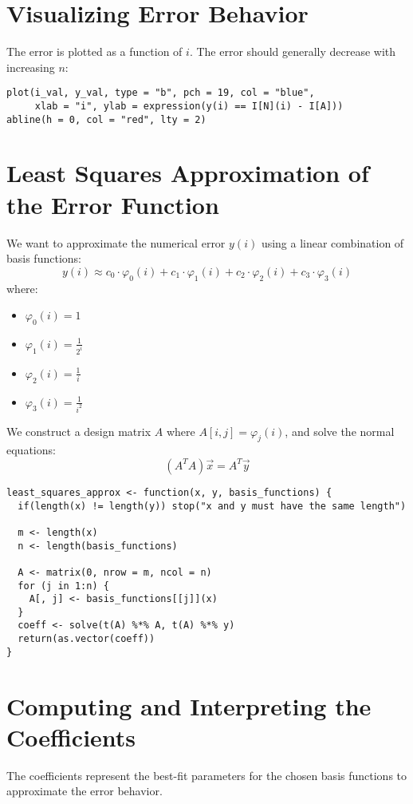 \documentclass[a4paper,12pt]{article}
\begin{document}
\section{Visualizing Error Behavior}
The error is plotted as a function of $i$. The error should generally decrease with increasing $n$:

\begin{lstlisting}[caption=Plot the numerical error]
plot(i_val, y_val, type = "b", pch = 19, col = "blue",
     xlab = "i", ylab = expression(y(i) == I[N](i) - I[A]))
abline(h = 0, col = "red", lty = 2)
\end{lstlisting}
\newpage
\section{Least Squares Approximation of the Error Function}
We want to approximate the numerical error $y(i)$ using a linear combination of basis functions:
\[ y(i) \approx c_0 \cdot \varphi_0(i) + c_1 \cdot \varphi_1(i) + c_2 \cdot \varphi_2(i) + c_3 \cdot \varphi_3(i) \]
where:
\begin{itemize}
  \item $\varphi_0(i) = 1$
  \item $\varphi_1(i) = \frac{1}{2^i}$
  \item $\varphi_2(i) = \frac{1}{i}$
  \item $\varphi_3(i) = \frac{1}{i^2}$
\end{itemize}

We construct a design matrix $A$ where $A[i,j] = \varphi_j(i)$, and solve the normal equations:
\[ (A^T A)\vec{x} = A^T \vec{y} \]

\begin{lstlisting}[caption=Least squares approximation function]
least_squares_approx <- function(x, y, basis_functions) {
  if(length(x) != length(y)) stop("x and y must have the same length")

  m <- length(x)
  n <- length(basis_functions)

  A <- matrix(0, nrow = m, ncol = n)
  for (j in 1:n) {
    A[, j] <- basis_functions[[j]](x)
  }
  coeff <- solve(t(A) %*% A, t(A) %*% y)
  return(as.vector(coeff))
}
\end{lstlisting}

\section{Computing and Interpreting the Coefficients}
The coefficients represent the best-fit parameters for the chosen basis functions to approximate the error behavior.
\end{document}
